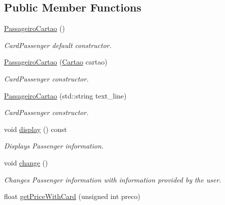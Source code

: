 \subsection*{Public Member Functions}
\begin{DoxyCompactItemize}
\item 
\mbox{\label{class_passageiro_cartao_ab50f6b3d23b9ae1106fdbfcb31985c64}} 
\hyperlink{class_passageiro_cartao_ab50f6b3d23b9ae1106fdbfcb31985c64}{Passageiro\+Cartao} ()
\begin{DoxyCompactList}\small\item\em Card\+Passenger default constructor. \end{DoxyCompactList}\item 
\hyperlink{class_passageiro_cartao_a057bea4531ca28f9ce41fb6ac3777e31}{Passageiro\+Cartao} (\hyperlink{class_cartao}{Cartao} cartao)
\begin{DoxyCompactList}\small\item\em Card\+Passenger constructor. \end{DoxyCompactList}\item 
\hyperlink{class_passageiro_cartao_a96bbc29d77b054eb31890230079f0961}{Passageiro\+Cartao} (std\+::string text\+\_\+line)
\begin{DoxyCompactList}\small\item\em Card\+Passenger constructor. \end{DoxyCompactList}\item 
\mbox{\label{class_passageiro_cartao_a227addaa1503cbab164a821d5ecc31a4}} 
void \hyperlink{class_passageiro_cartao_a227addaa1503cbab164a821d5ecc31a4}{display} () const
\begin{DoxyCompactList}\small\item\em Displays Passenger information. \end{DoxyCompactList}\item 
\mbox{\label{class_passageiro_cartao_af1e3f1909d80c783301eaece5926dc47}} 
void \hyperlink{class_passageiro_cartao_af1e3f1909d80c783301eaece5926dc47}{change} ()
\begin{DoxyCompactList}\small\item\em Changes Passenger information with information provided by the user. \end{DoxyCompactList}\item 
float \hyperlink{class_passageiro_cartao_a2bd1b79ef18e3289545386a8740b1136}{get\+Price\+With\+Card} (unsigned int preco)

\end{DoxyCompactItemize}
